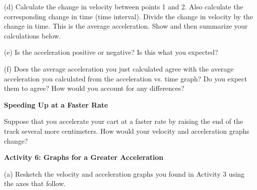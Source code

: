 (d) Calculate the change in velocity between points 1 and 2. Also calculate
the corresponding change in time (time interval). Divide the change in velocity
by the change in time. This is the average acceleration. Show and then summarize your calculations below. 
\vspace{20mm}

(e) Is the acceleration positive or negative? Is this what you expected? 
\vspace{20mm}

(f) Does the average acceleration you just calculated agree with the average
acceleration you calculated from the acceleration vs. time graph? Do you expect them to agree? How would you account for any differences? 
\vspace{20mm}

\textbf{Speeding Up at a Faster Rate} 

Suppose that you accelerate your cart at a faster rate by raising the end of the track several more centimeters. How would your velocity and acceleration graphs change? 

\vspace{20mm}

\textbf{Activity 6: Graphs for a Greater Acceleration} 

(a) Resketch the velocity and acceleration graphs you found in Activity 3 using
the axes that follow.

